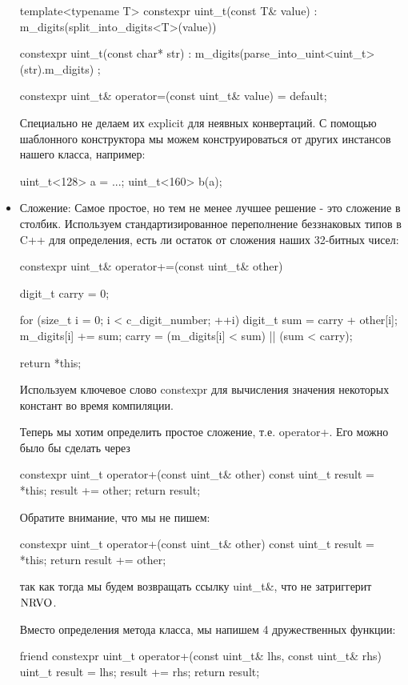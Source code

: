\begin{itemize}
\begin{cppcode}
template<typename T>
constexpr uint_t(const T& value) : m_digits(split_into_digits<T>(value)) {}

constexpr uint_t(const char* str) : m_digits(parse_into_uint<uint_t>(str).m_digits) {};

constexpr uint_t& operator=(const uint_t& value) = default;
    \end{cppcode}
    Специально не делаем их explicit для неявных конвертаций. С помощью шаблонного конструктора мы можем конструироваться от других инстансов нашего класса, например:
    \begin{cppcode}
uint_t<128> a = ...;
uint_t<160> b(a);
    \end{cppcode}
  \item Сложение:
    Самое простое, но тем не менее лучшее решение - это сложение в столбик. Используем стандартизированное переполнение беззнаковых типов в C++ для определения, есть ли остаток от сложения наших 32-битных чисел:
    \begin{cppcode}
constexpr uint_t& operator+=(const uint_t& other) {
    digit_t carry = 0;

    for (size_t i = 0; i < c_digit_number; ++i) {
        digit_t sum = carry + other[i];
        m_digits[i] += sum;
        carry = (m_digits[i] < sum) || (sum < carry);
    }

    return *this;
}
    \end{cppcode}
    Используем ключевое слово constexpr для вычисления значения некоторых констант во время компиляции.

    Теперь мы хотим определить простое сложение, т.е. operator+. Его можно было бы сделать через
    \begin{cppcode}
constexpr uint_t operator+(const uint_t& other) const {
    uint_t result = *this;
    result += other;
    return result;
}
    \end{cppcode}
    Обратите внимание, что мы не пишем:
    \begin{cppcode}
constexpr uint_t operator+(const uint_t& other) const {
    uint_t result = *this;
    return result += other;
}
    \end{cppcode}
    так как тогда мы будем возвращать ссылку uint\_t\&, что не затриггерит $\rm NRVO$.

    Вместо определения метода класса, мы напишем 4 дружественных функции:
    \begin{cppcode}
friend constexpr uint_t operator+(const uint_t& lhs, const uint_t& rhs) {
    uint_t result = lhs;
    result += rhs;
    return result;
}


\end{cppcode}
\end{itemize}
